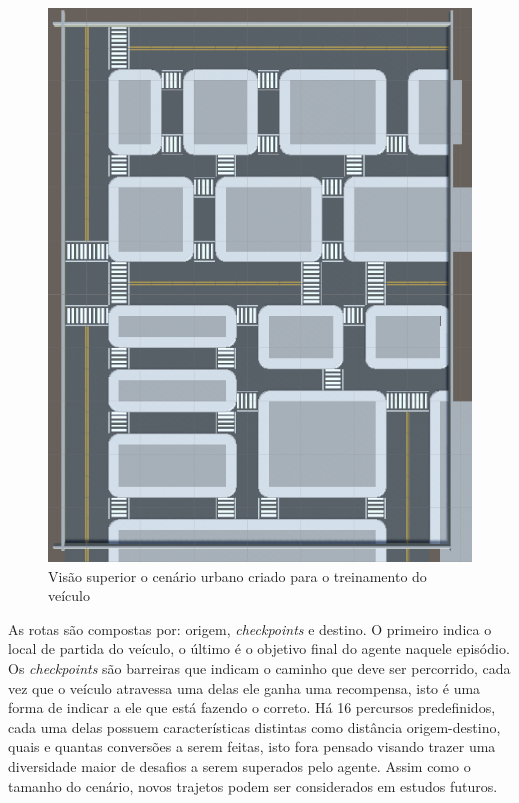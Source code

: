 \begin{figure}[h]
   \centering
   \includegraphics[scale=0.5, angle=90]{figs/Mapa-simulador-visao-superior.png}
    \caption{Visão superior o cenário urbano criado para o treinamento do veículo}
    \label{fig:map-view}
 \end{figure}

As rotas são compostas por: origem, \textit{checkpoints} e destino. O primeiro indica o local de partida do veículo, o último é o objetivo final do agente naquele episódio. Os \textit{checkpoints} são barreiras que indicam o caminho que deve ser percorrido, cada vez que o veículo atravessa uma delas ele ganha uma recompensa, isto é uma forma de indicar a ele que está fazendo o correto. Há 16 percursos predefinidos, cada uma delas possuem características distintas como distância origem-destino, quais e quantas conversões a serem feitas, isto fora pensado visando trazer uma diversidade maior de desafios a serem superados pelo agente. Assim como o tamanho do cenário, novos trajetos podem ser considerados em estudos futuros.

